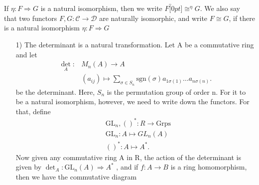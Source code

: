 \documentclass[../category_theory.tex]{subfiles}
\begin{document}
If \(\eta : F \Rightarrow  G\) is a natural isomorphism, then we write \(F\overbracket[0pt]{\cong}^{\eta } G\). We also say that two functors \(F, G:\mathcal{C}\rightarrow \mathcal{D}\) are naturally isomorphic, and write \(F\cong G\), if there is a natural isomorphism \(\eta :F \Rightarrow G \)
\begin{example}
	\begin{itemize}
		\item[1)] The determinant is a natural transformation. Let A be a commutative ring and let
		      \begin{align*}
			      \det_{A}{}: & M_{n}(A)\rightarrow A                                                                                        \\
			                  & (a_{ij})\mapsto \sum\limits_{\sigma \in S_{n}}^{}\mathrm{sgn}(\sigma )a_{1\sigma (1)}\dotsc a_{n\sigma (n)}.
		      \end{align*}
		      be the determinant. Here, \(S_{n}\) is the permutation group of order n. For it to be a natural isomorphism, however, we need to write down the functors. For that, define
		      \begin{align*}
			       & \mathrm{GL}_{n}, ()^{*}:R\rightarrow \mathrm{Grps} \\
			       & \mathrm{GL}_{n}:A\mapsto GL_{n}(A)                 \\
			       & ()^{*}:A\mapsto A^{*}.
		      \end{align*}
		      Now given any commutative ring A in R, the action of the determinant is given by \(\det_{A}:\mathrm{GL}_{n}(A)\Rightarrow A^{*}\) , and if \(f:A\rightarrow B\) is a ring homomorphism, then we have the commutative diagram
		      \begin{center}
\end{center}
\end{itemize}
\end{example}
\end{document}
